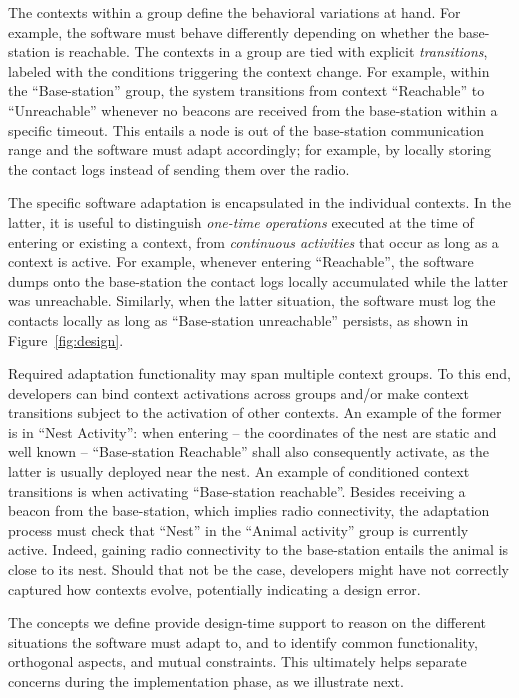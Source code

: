 The contexts within a group define the behavioral variations at
hand. For example, the software must behave differently depending on
whether the base-station is reachable.  The contexts in a group are
tied with explicit \emph{transitions}, labeled with the conditions
triggering the context change. For example, within the
``Base-station'' group, the system transitions from context
``Reachable'' to ``Unreachable'' whenever no beacons are received from
the base-station within a specific timeout. This entails a node is out
of the base-station communication range and the software must adapt
accordingly; for example, by locally storing the contact logs instead
of sending them over the radio.

The specific software adaptation is encapsulated in the individual
contexts. In the latter, it is useful to distinguish \emph{one-time
  operations} executed at the time of entering or existing a context,
from \emph{continuous activities} that occur as long as a context is
active. For example, whenever entering ``Reachable'', the software
dumps onto the base-station the contact logs locally accumulated while
the latter was unreachable. Similarly, when the latter situation, the
software must log the contacts locally as long as ``Base-station
unreachable'' persists, as shown in Figure~\ref{fig:design}.

Required adaptation functionality may span multiple context groups. To
this end, developers can bind context activations across groups and/or
make context transitions subject to the activation of other
contexts. An example of the former is in ``Nest Activity'': when entering --
the coordinates of the nest are static and well known -- ``Base-station
Reachable'' shall also consequently activate, as the latter is usually deployed
near the nest. An example of conditioned context transitions is when activating
``Base-station reachable''. Besides receiving a beacon from the
base-station, which implies radio connectivity, the adaptation process
must check that ``Nest'' in the ``Animal activity'' group is
currently active. Indeed, gaining radio connectivity to the
base-station entails the animal is close to its nest. Should that not be the
case, developers might have not correctly captured how contexts
evolve, potentially indicating a design error.

The concepts we define provide design-time support to reason on the
different situations the software must adapt to, and to identify common
functionality, orthogonal aspects, and mutual constraints. This
ultimately helps separate concerns during the implementation phase, as
we illustrate next.



